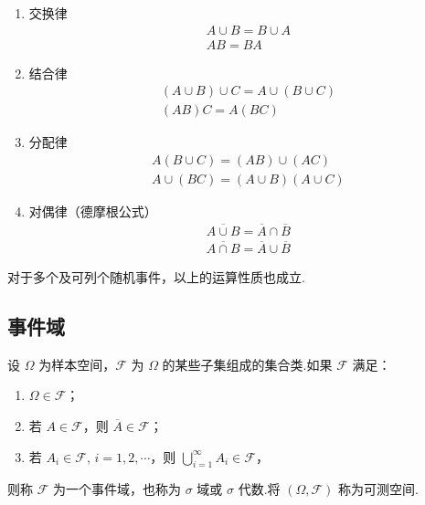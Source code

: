 \begin{property}
    \begin{enumerate}
        \item 交换律
        $$
        \begin{gathered}
            A \cup B = B \cup A \\
            AB=BA
        \end{gathered}
        $$
        \item 结合律
        $$
        \begin{gathered}
            (A \cup B) \cup C = A \cup (B \cup C) \\
            (AB)C=A(BC)
        \end{gathered}
        $$
        \item 分配律
        $$
        \begin{gathered}
            A(B \cup C) = (AB) \cup (AC) \\
            A \cup (BC) = (A \cup B)(A \cup C)
        \end{gathered}
        $$
        \item 对偶律（德摩根公式）
        $$
        \begin{gathered}
            \overline{A \cup B} = \overline{A} \cap \overline{B} \\
            \overline{A \cap B} = \overline{A} \cup \overline{B}
        \end{gathered}
        $$
    \end{enumerate}
\end{property}

对于多个及可列个随机事件，以上的运算性质也成立.

\subsection{事件域}

\begin{definition}
    \indent 设 $\varOmega$ 为样本空间，$\mathcal{F}$ 为 $\varOmega$ 的某些子集组成的集合类.如果 $\mathcal{F}$ 满足：
    \begin{enumerate}
        \item $\varOmega \in \mathcal{F}$；
        \item 若 $A \in \mathcal{F}$，则 $\overline{A} \in \mathcal{F}$；
        \item 若 $A_i \in \mathcal{F}, \, i=1,2,\cdots$，则 $\displaystyle\bigcup_{i=1}^\infty A_i \in \mathcal{F}$，
    \end{enumerate}
    则称 $\mathcal{F}$ 为一个{\heiti 事件域}，也称为 $\sigma$ {\heiti 域}或 $\sigma$ {\heiti 代数}.将 $(\varOmega, \mathcal{F})$ 称为{\heiti 可测空间}.
\end{definition}

